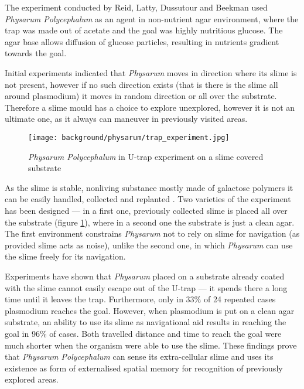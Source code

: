 The experiment conducted by Reid, Latty, Dussutour and Beekman \cite{reid2012slime} used \textit{Physarum Polycephalum} as an agent in non-nutrient agar environment, where the trap was made out of acetate and the goal was highly nutritious glucose. The agar base allows diffusion of glucose particles, resulting in nutrients gradient towards the goal.

Initial experiments indicated that \textit{Physarum} moves in direction where its slime is not present, however if no such direction exists (that is there is the slime all around plasmodium) it moves in random direction or all over the substrate. Therefore a slime mould has a choice to explore unexplored, however it is not an ultimate one, as it always can maneuver in previously visited areas. 

\begin{figure}
  \centering
  \texttt{[image: background/physarum/trap\_experiment.jpg]}
  \caption{\textit{Physarum Polycephalum} in U-trap experiment on a slime covered substrate \cite{reid2012slime}}
  \label{figure:bp_trap_experiment}
\end{figure}

As the slime is stable, nonliving substance mostly made of galactose polymers it can be easily handled, collected and replanted \cite{mccormick1970isolation}. Two varieties of the experiment has been designed --- in a first one, previously collected slime is placed all over the substrate (figure \ref{figure:bp_trap_experiment}), where in a second one the substrate is just a clean agar. The first environment constrains \textit{Physarum} not to rely on slime for navigation (as provided slime acts as noise), unlike the second one, in which \textit{Physarum} can use the slime freely for its navigation.

Experiments have shown that \textit{Physarum} placed on a substrate already coated with the slime cannot easily escape out of the U-trap --- it spends there a long time until it leaves the trap. Furthermore, only in 33\% of 24 repeated cases plasmodium reaches the goal. However, when plasmodium is put on a clean agar substrate, an ability to use its slime as navigational aid results in reaching the goal in 96\% of cases. Both travelled distance and time to reach the goal were much shorter when the organism were able to use the slime. These findings prove that \textit{Physarum Polycephalum} can sense its extra-cellular slime and uses its existence as form of externalised spatial memory for recognition of previously explored areas.


